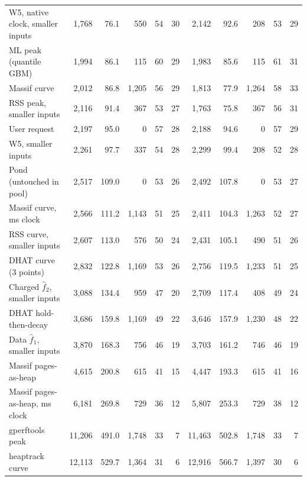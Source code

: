 \begin{tabular}{lrrrrrrrrrr}
\memprint{} W5, native clock, smaller inputs & 1{,}768 & 76.1 & 550 & 54 & 30 & 2{,}142 & 92.6 & 208 & 53 & 29 \\
ML peak (quantile GBM) & 1{,}994 & 86.1 & 115 & 60 & 29 & 1{,}983 & 85.6 & 115 & 61 & 31 \\
Massif curve & 2{,}012 & 86.8 & 1{,}205 & 56 & 29 & 1{,}813 & 77.9 & 1{,}264 & 58 & 33 \\
RSS peak, smaller inputs & 2{,}116 & 91.4 & 367 & 53 & 27 & 1{,}763 & 75.8 & 367 & 56 & 31 \\
User request & 2{,}197 & 95.0 & 0 & 57 & 28 & 2{,}188 & 94.6 & 0 & 57 & 29 \\
\memprint{} W5, smaller inputs & 2{,}261 & 97.7 & 337 & 54 & 28 & 2{,}299 & 99.4 & 208 & 52 & 28 \\
Pond (untouched in pool) & 2{,}517 & 109.0 & 0 & 53 & 26 & 2{,}492 & 107.8 & 0 & 53 & 27 \\
Massif curve, ms clock & 2{,}566 & 111.2 & 1{,}143 & 51 & 25 & 2{,}411 & 104.3 & 1{,}263 & 52 & 27 \\
RSS curve, smaller inputs & 2{,}607 & 113.0 & 576 & 50 & 24 & 2{,}431 & 105.1 & 490 & 51 & 26 \\
DHAT curve (3 points) & 2{,}832 & 122.8 & 1{,}169 & 53 & 26 & 2{,}756 & 119.5 & 1{,}233 & 51 & 25 \\
Charged $\hat f_2$, smaller inputs & 3{,}088 & 134.4 & 959 & 47 & 20 & 2{,}709 & 117.4 & 408 & 49 & 24 \\
DHAT hold-then-decay & 3{,}686 & 159.8 & 1{,}169 & 49 & 22 & 3{,}646 & 157.9 & 1{,}230 & 48 & 22 \\
Data $\hat f_1$, smaller inputs & 3{,}870 & 168.3 & 756 & 46 & 19 & 3{,}703 & 161.2 & 746 & 46 & 19 \\
Massif pages-as-heap & 4{,}615 & 200.8 & 615 & 41 & 15 & 4{,}447 & 193.3 & 615 & 41 & 16 \\
Massif pages-as-heap, ms clock & 6{,}181 & 269.8 & 729 & 36 & 12 & 5{,}807 & 253.3 & 729 & 38 & 12 \\
gperftools peak & 11{,}206 & 491.0 & 1{,}748 & 33 & 7 & 11{,}463 & 502.8 & 1{,}748 & 33 & 7 \\
heaptrack curve & 12{,}113 & 529.7 & 1{,}364 & 31 & 6 & 12{,}916 & 566.7 & 1{,}397 & 30 & 6 \\
\bottomrule
\end{tabular}
